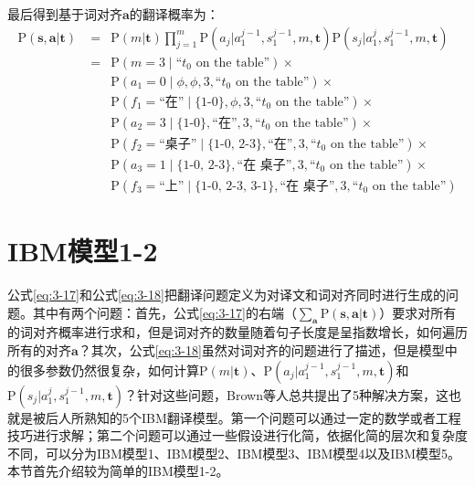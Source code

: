 \parinterval 最后得到基于词对齐$\mathbf{a}$的翻译概率为：
\begin{eqnarray}
\textrm{P}(\mathbf{s},\mathbf{a}|\mathbf{t})\; &= & \textrm{P}(m|\mathbf{t}) \prod\limits_{j=1}^{m} \textrm{P}(a_j|a_{1}^{j-1},s_{1}^{j-1},m,\mathbf{t}) \textrm{P}(s_j|a_{1}^{j},s_{1}^{j-1},m,\mathbf{t}) \nonumber \\
&=&\textrm{P}(m=3 \mid \textrm{``$t_0$ on the table''}){\times} \nonumber \\
&&{\textrm{P}(a_1=0 \mid \phi,\phi,3,\textrm{``$t_0$ on the table''}){\times} } \nonumber \\
&&{\textrm{P}(f_1=\textrm{``在''} \mid \textrm{\{1-0\}},\phi,3,\textrm{``$t_0$ on the table''}){\times} } \nonumber \\
&&{\textrm{P}(a_2=3 \mid \textrm{\{1-0\}},\textrm{``在''},3,\textrm{``$t_0$ on the table''}) {\times}} \nonumber \\
&&{\textrm{P}(f_2=\textrm{``桌子''} \mid \textrm{\{1-0, 2-3\}},\textrm{``在''},3,\textrm{``$t_0$ on the table''}) {\times}} \nonumber \\
&&{\textrm{P}(a_3=1 \mid \textrm{\{1-0, 2-3\}},\textrm{``在\ \ 桌子''},3,\textrm{``$t_0$ on the table''}) {\times}} \nonumber \\
&&{\textrm{P}(f_3=\textrm{``上''} \mid \textrm{\{1-0, 2-3, 3-1\}},\textrm{``在\ \ 桌子''},3,\textrm{``$t_0$ on the table''})  }
\label{eq:3-19}
\end{eqnarray}


\sectionnewpage
\vspace{-2em}
\section{IBM模型1-2}
\parinterval 公式\ref{eq:3-17}和公式\ref{eq:3-18}把翻译问题定义为对译文和词对齐同时进行生成的问题。其中有两个问题：首先，公式\ref{eq:3-17}的右端（$ \sum_{\mathbf{a}}\textrm{P}(\mathbf{s},\mathbf{a}|\mathbf{t})$）要求对所有的词对齐概率进行求和，但是词对齐的数量随着句子长度是呈指数增长，如何遍历所有的对齐$\mathbf{a}$？其次，公式\ref{eq:3-18}虽然对词对齐的问题进行了描述，但是模型中的很多参数仍然很复杂，如何计算$\textrm{P}(m|\mathbf{t})$、$\textrm{P}(a_j|a_1^{j-1},s_1^{j-1},m,\mathbf{t})$和$\textrm{P}(s_j|a_1^{j},s_1^{j-1},m,\mathbf{t})$？针对这些问题，Brown等人总共提出了5种解决方案，这也就是被后人所熟知的5个IBM翻译模型。第一个问题可以通过一定的数学或者工程技巧进行求解；第二个问题可以通过一些假设进行化简，依据化简的层次和复杂度不同，可以分为IBM模型1、IBM模型2、IBM模型3、IBM模型4以及IBM模型5。本节首先介绍较为简单的IBM模型1-2。

